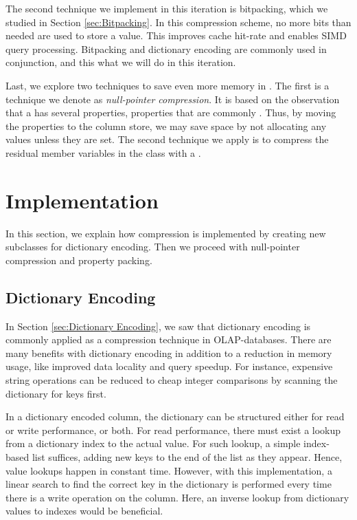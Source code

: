 The second technique we implement in this iteration is bitpacking, which we studied in Section \ref{sec:Bitpacking}. In this compression scheme, no more bits than needed are used to store a value. This improves cache hit-rate and enables SIMD query processing. Bitpacking and dictionary encoding are commonly used in conjunction, and this what we will do in this iteration.

Last, we explore two techniques to save even more memory in \gap. The first is a technique we denote as \textit{null-pointer compression}. It is based on the observation that a  has several properties, properties that are commonly \null. Thus, by moving the properties to the column store, we may save space by not allocating any values unless they are set. The second technique we apply is to compress the residual member variables in the  class with a .

\section{Implementation}
\label{sec:Implementation}
In this section, we explain how compression is implemented by creating new  subclasses for dictionary encoding. Then we proceed with null-pointer compression and property packing.

\subsection{Dictionary Encoding}
\label{compression:dictionary-encoding}
In Section \ref{sec:Dictionary Encoding}, we saw that dictionary encoding is commonly applied as a compression technique in OLAP-databases. There are many benefits with dictionary encoding in addition to a reduction in memory usage, like improved data locality and query speedup. For instance, expensive string operations can be reduced to cheap integer comparisons by scanning the dictionary for keys first.

In a dictionary encoded column, the dictionary can be structured either for read or write performance, or both. For read performance, there must exist a lookup from a dictionary index to the actual value. For such lookup, a simple index-based list suffices, adding new keys to the end of the list as they appear. Hence, value lookups happen in constant time. However, with this implementation, a linear search to find the correct key in the dictionary is performed every time there is a write operation on the column. Here, an inverse lookup from dictionary values to indexes would be beneficial.

